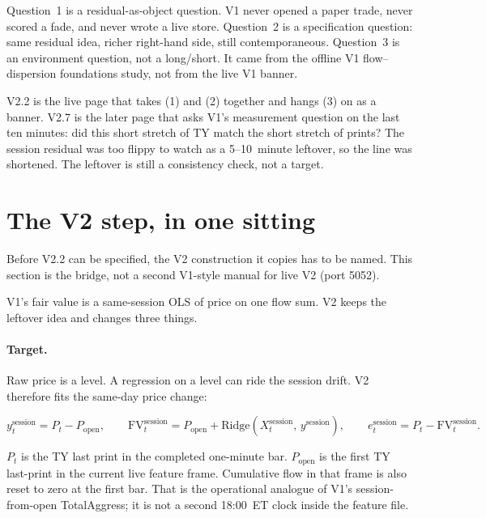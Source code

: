 \documentclass[11pt]{article}
\begin{document}
Question~1 is a residual-as-object question.  V1 never opened a
paper trade, never scored a fade, and never wrote a live store.
Question~2 is a specification question: same residual idea, richer
right-hand side, still contemporaneous.  Question~3 is an environment
question, not a long/short.  It came from the offline V1
flow--dispersion foundations study, not from the live V1 banner.

V2.2 is the live page that takes (1) and (2) together and hangs (3)
on as a banner.  V2.7 is the later page that asks V1's measurement
question on the last ten minutes: did this short stretch of TY
match the short stretch of prints?  The session residual was too
flippy to watch as a 5--10~minute leftover, so the line was
shortened.  The leftover is still a consistency check, not a
target.


\section{The V2 step, in one sitting}

Before V2.2 can be specified, the V2 construction it copies has to be
named.  This section is the bridge, not a second V1-style manual for
live V2 (port 5052).

V1's fair value is a same-session OLS of price on one flow sum.
V2 keeps the leftover idea and changes three things.

\paragraph{Target.}
Raw price is a level.  A regression on a level can ride the session
drift.  V2 therefore fits the same-day price change:

\begin{equation}
  y^{\mathrm{session}}_t
  =
  P_t - P_{\mathrm{open}},
  \qquad
  \mathrm{FV}^{\mathrm{session}}_t
  =
  P_{\mathrm{open}}
  +
  \mathrm{Ridge}(X^{\mathrm{session}}_t,\, y^{\mathrm{session}}),
  \qquad
  e^{\mathrm{session}}_t
  =
  P_t - \mathrm{FV}^{\mathrm{session}}_t.
\end{equation}

\(P_t\) is the TY last print in the completed one-minute bar.
\(P_{\mathrm{open}}\) is the first TY last-print in the current live
feature frame.  Cumulative flow in that frame is also reset to zero
at the first bar.  That is the operational analogue of V1's
session-from-open TotalAggress; it is not a second 18:00~ET clock
inside the feature file.
\end{document}
